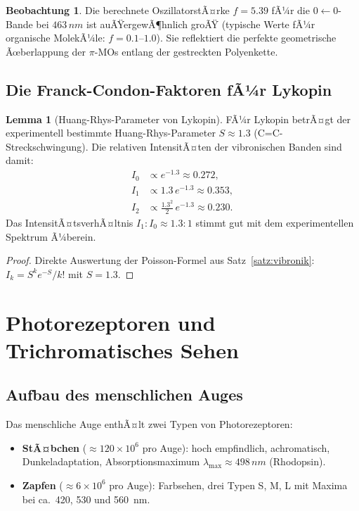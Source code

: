 ﻿\documentclass[a4paper,12pt]{article}
\theoremstyle{definition}
\newtheorem{lemma}{Lemma}
\newtheorem{beobachtung}{Beobachtung}
\begin{document}
\begin{beobachtung}
Die berechnete OszillatorstÃ¤rke $f = 5.39$ fÃ¼r die $0\leftarrow0$-Bande bei
$463\,\si{nm}$ ist auÃŸergewÃ¶hnlich groÃŸ (typische Werte fÃ¼r organische MolekÃ¼le:
$f = 0.1$--$1.0$). Sie reflektiert die perfekte geometrische Ãœberlappung der
$\pi$-MOs entlang der gestreckten Polyenkette.
\end{beobachtung}

\subsection{Die Franck-Condon-Faktoren fÃ¼r Lykopin}

\begin{lemma}[Huang-Rhys-Parameter von Lykopin]
FÃ¼r Lykopin betrÃ¤gt der experimentell bestimmte Huang-Rhys-Parameter
$S \approx 1.3$ (C=C-Streckschwingung). Die relativen IntensitÃ¤ten
der vibronischen Banden sind damit:
\begin{align*}
  I_0 &\propto e^{-1.3} \approx 0.272, \\
  I_1 &\propto 1.3\,e^{-1.3} \approx 0.353, \\
  I_2 &\propto \frac{1.3^2}{2}\,e^{-1.3} \approx 0.230.
\end{align*}
Das IntensitÃ¤tsverhÃ¤ltnis $I_1 : I_0 \approx 1.3 : 1$ stimmt gut mit dem experimentellen
Spektrum Ã¼berein.
\end{lemma}

\begin{proof}
Direkte Auswertung der Poisson-Formel aus Satz~\ref{satz:vibronik}:
$I_k = S^k e^{-S} / k!$ mit $S = 1.3$.
\end{proof}

\section{Photorezeptoren und Trichromatisches Sehen}

\subsection{Aufbau des menschlichen Auges}

Das menschliche Auge enthÃ¤lt zwei Typen von Photorezeptoren:
\begin{itemize}
  \item \textbf{StÃ¤bchen} ($\approx 120 \times 10^6$ pro Auge): hoch empfindlich, achromatisch,
        Dunkeladaptation, Absorptionsmaximum $\lambda_{\max} \approx 498\,\si{nm}$ (Rhodopsin).
  \item \textbf{Zapfen} ($\approx 6 \times 10^6$ pro Auge): Farbsehen, drei Typen S, M, L
        mit Maxima bei ca.\ 420, 530 und 560~nm.
\end{itemize}
\end{document}
